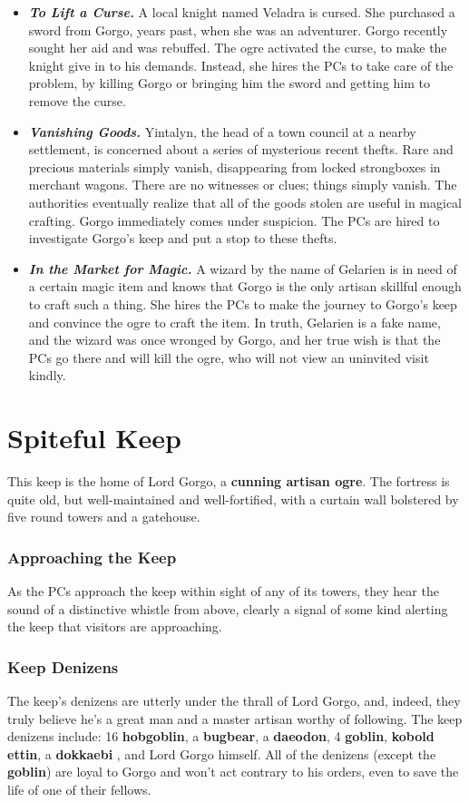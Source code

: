 \documentclass[10pt,a4paper,twoside,bg=print,twocolumn,openany,nodeprecatedcode]{dndbook}
\begin{document}
\begin{itemize}
\item \textbf{\textit{To Lift a Curse.}} A local knight named Veladra is cursed. She purchased a sword from Gorgo, years past, when she was an adventurer. Gorgo recently sought her aid and was rebuffed. The ogre activated the curse, to make the knight give in to his demands. Instead, she hires the PCs to take care of the problem, by killing Gorgo or bringing him the sword and getting him to remove the curse.
\item \textbf{\textit{Vanishing Goods.}} Yintalyn, the head of a town council at a nearby settlement, is concerned about a series of mysterious recent thefts. Rare and precious materials simply vanish, disappearing from locked strongboxes in merchant wagons. There are no witnesses or clues; things simply vanish. The authorities eventually realize that all of the goods stolen are useful in magical crafting. Gorgo immediately comes under suspicion. The PCs are hired to investigate Gorgo's keep and put a stop to these thefts.
\item \textbf{\textit{In the Market for Magic.}} A wizard by the name of Gelarien is in need of a certain magic item and knows that Gorgo is the only artisan skillful enough to craft such a thing. She hires the PCs to make the journey to Gorgo's keep and convince the ogre to craft the item. In truth, Gelarien is a fake name, and the wizard was once wronged by Gorgo, and her true wish is that the PCs go there and will kill the ogre, who will not view an uninvited visit kindly.
\end{itemize}

\section{Spiteful Keep}
This keep is the home of Lord Gorgo, a \textbf{cunning artisan ogre}. The fortress is quite old, but well-maintained and well-fortified, with a curtain wall bolstered by five round towers and a gatehouse.

\subsubsection{Approaching the Keep}
As the PCs approach the keep within sight of any of its towers, they hear the sound of a distinctive whistle from above, clearly a signal of some kind alerting the keep that visitors are approaching.

\subsubsection{Keep Denizens}
The keep's denizens are utterly under the thrall of Lord Gorgo, and, indeed, they truly believe he's a great man and a master artisan worthy of following. The keep denizens include: 16 \textbf{hobgoblin}, a \textbf{bugbear}, a \textbf{daeodon}, 4 \textbf{goblin}, \textbf{kobold ettin}, a \textbf{dokkaebi} , and Lord Gorgo himself. All of the denizens (except the \textbf{goblin}) are loyal to Gorgo and won't act contrary to his orders, even to save the life of one of their fellows.
\end{document}
